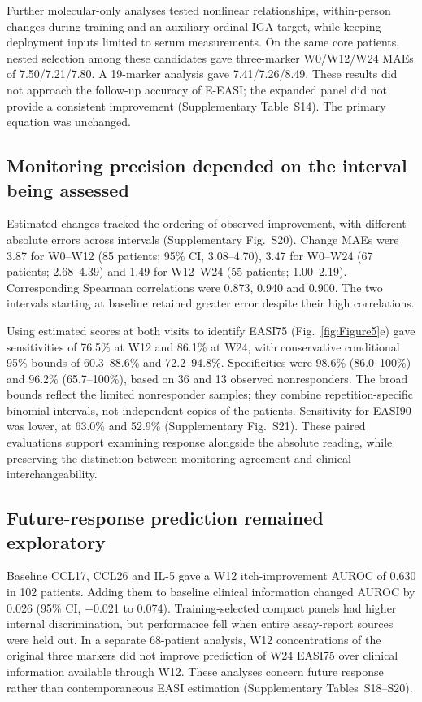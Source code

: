 \documentclass[10pt,a4paper]{article}
\begin{document}
Further molecular-only analyses tested nonlinear relationships, within-person changes during training and an auxiliary ordinal IGA target, while keeping deployment inputs limited to serum measurements. On the same core patients, nested selection among these candidates gave three-marker W0/W12/W24 MAEs of 7.50/7.21/7.80. A 19-marker analysis gave 7.41/7.26/8.49. These results did not approach the follow-up accuracy of E-EASI; the expanded panel did not provide a consistent improvement (Supplementary Table~S14). The primary equation was unchanged.

\subsection{Monitoring precision depended on the interval being assessed}
Estimated changes tracked the ordering of observed improvement, with different absolute errors across intervals (Supplementary Fig.~S20). Change MAEs were 3.87 for W0--W12 (85 patients; 95\% CI, 3.08--4.70), 3.47 for W0--W24 (67 patients; 2.68--4.39) and 1.49 for W12--W24 (55 patients; 1.00--2.19). Corresponding Spearman correlations were 0.873, 0.940 and 0.900. The two intervals starting at baseline retained greater error despite their high correlations.

Using estimated scores at both visits to identify EASI75 (Fig.~\ref{fig:Figure5}e) gave sensitivities of 76.5\% at W12 and 86.1\% at W24, with conservative conditional 95\% bounds of 60.3--88.6\% and 72.2--94.8\%. Specificities were 98.6\% (86.0--100\%) and 96.2\% (65.7--100\%), based on 36 and 13 observed nonresponders. The broad bounds reflect the limited nonresponder samples; they combine repetition-specific binomial intervals, not independent copies of the patients. Sensitivity for EASI90 was lower, at 63.0\% and 52.9\% (Supplementary Fig.~S21). These paired evaluations support examining response alongside the absolute reading, while preserving the distinction between monitoring agreement and clinical interchangeability.

\subsection{Future-response prediction remained exploratory}
Baseline CCL17, CCL26 and IL-5 gave a W12 itch-improvement AUROC of 0.630 in 102 patients. Adding them to baseline clinical information changed AUROC by 0.026 (95\% CI, $-$0.021 to 0.074). Training-selected compact panels had higher internal discrimination, but performance fell when entire assay-report sources were held out. In a separate 68-patient analysis, W12 concentrations of the original three markers did not improve prediction of W24 EASI75 over clinical information available through W12. These analyses concern future response rather than contemporaneous EASI estimation (Supplementary Tables~S18--S20).
\end{document}
